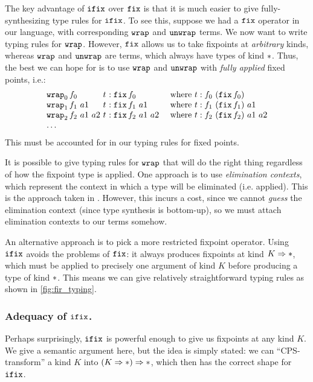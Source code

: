 \noindent The key advantage of $\operatorname{\texttt{ifix}}$ over $\operatorname{\texttt{fix}}$ is that it is much easier to give
fully-synthesizing type rules for $\operatorname{\texttt{ifix}}$. To see this, suppose we had a $\operatorname{\texttt{fix}}$
operator in our language, with corresponding $\operatorname{\texttt{wrap}}$
and $\operatorname{\texttt{unwrap}}$ terms. We now want to write typing rules for $\operatorname{\texttt{wrap}}$.
However, $\operatorname{\texttt{fix}}$ allows us to take fixpoints at \emph{arbitrary} kinds, whereas
$\operatorname{\texttt{wrap}}$ and $\operatorname{\texttt{unwrap}}$ are terms, which always have types of kind $\operatorname{\ast}$.
Thus, the best we can hope for is to use $\operatorname{\texttt{wrap}}$ and $\operatorname{\texttt{unwrap}}$ with \emph{fully applied} fixed points, i.e.:
\begin{displaymath}
\begin{array}{l@{\ }l@{\ }l@{\ }l@{\ }l}
\wrap_0 f_0            & t &: \fixo f_0 & \quad\textrm{where} & t : f_0\ (\fixo f_0)\\
\wrap_1 f_1  ~ a1      & t &: \fixo f_1\ a1 & \quad\textrm{where} & t : f_1\ (\fixo f_1)\ a1\\
\wrap_2 f_2  ~ a1 ~ a2 & t &: \fixo f_2\ a1\ a2 & \quad\textrm{where} & t : f_2\ (\fixo f_2)\ a1\ a2\\
\dots & & & & 
\end{array}
\end{displaymath}
This must be accounted for in our typing rules for fixed points. 

It is possible to give typing rules for $\operatorname{\texttt{wrap}}$ that will do the right thing
regardless of how the fixpoint type is applied. One approach is to use
\emph{elimination contexts}, which represent the context in which a type will be
eliminated (i.e. applied). This is the approach taken in
\cite{dreyer2005understanding}. However, this incurs a cost, since we cannot
\emph{guess} the elimination context (since type synthesis is bottom-up), so we
must attach elimination contexts to our terms somehow.

An alternative approach is to pick a more restricted fixpoint operator. Using $\operatorname{\texttt{ifix}}$
avoids the problems of $\operatorname{\texttt{fix}}$: it always produces fixpoints at kind $K \Rightarrow
\operatorname{\ast}$, which must be applied to precisely one argument of kind $K$ before
producing a type of kind $\operatorname{\ast}$. This means we can give relatively straightforward typing rules as shown
in \cref{fig:fir_typing}.

\subsubsection{Adequacy of $\operatorname{\texttt{ifix}}$.}

Perhaps surprisingly, $\operatorname{\texttt{ifix}}$ is powerful enough to give us fixpoints at any
kind $K$. We give a semantic argument here, but the idea is simply 
stated: we can ``CPS-transform'' a kind $K$ into
$(K \Rightarrow \operatorname{\ast}) \Rightarrow \operatorname{\ast}$, which then has the correct shape for
$\operatorname{\texttt{ifix}}$.
 
